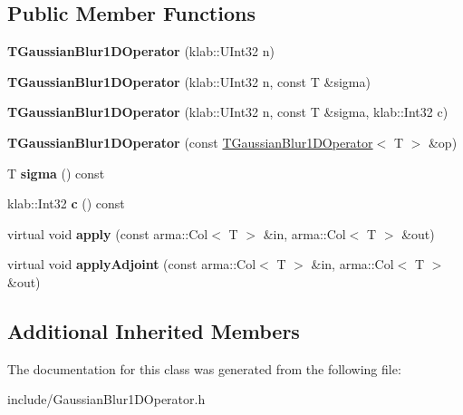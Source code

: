 \subsection*{Public Member Functions}
\begin{DoxyCompactItemize}
\item 
{\bfseries T\+Gaussian\+Blur1\+D\+Operator} (klab\+::\+U\+Int32 n)\hypertarget{classkl1p_1_1TGaussianBlur1DOperator_adfce593c12eed171d36fc4c644b46581}{}\label{classkl1p_1_1TGaussianBlur1DOperator_adfce593c12eed171d36fc4c644b46581}

\item 
{\bfseries T\+Gaussian\+Blur1\+D\+Operator} (klab\+::\+U\+Int32 n, const T \&sigma)\hypertarget{classkl1p_1_1TGaussianBlur1DOperator_a6bbbb52566ad498961cea10eb41cd3c6}{}\label{classkl1p_1_1TGaussianBlur1DOperator_a6bbbb52566ad498961cea10eb41cd3c6}

\item 
{\bfseries T\+Gaussian\+Blur1\+D\+Operator} (klab\+::\+U\+Int32 n, const T \&sigma, klab\+::\+Int32 c)\hypertarget{classkl1p_1_1TGaussianBlur1DOperator_a46967bf1040233065f9632491112258f}{}\label{classkl1p_1_1TGaussianBlur1DOperator_a46967bf1040233065f9632491112258f}

\item 
{\bfseries T\+Gaussian\+Blur1\+D\+Operator} (const \hyperlink{classkl1p_1_1TGaussianBlur1DOperator}{T\+Gaussian\+Blur1\+D\+Operator}$<$ T $>$ \&op)\hypertarget{classkl1p_1_1TGaussianBlur1DOperator_a15736b401979249a7db00f56106bab68}{}\label{classkl1p_1_1TGaussianBlur1DOperator_a15736b401979249a7db00f56106bab68}

\item 
T {\bfseries sigma} () const \hypertarget{classkl1p_1_1TGaussianBlur1DOperator_aff4f98560b1abb8ea038b0e7ce862be5}{}\label{classkl1p_1_1TGaussianBlur1DOperator_aff4f98560b1abb8ea038b0e7ce862be5}

\item 
klab\+::\+Int32 {\bfseries c} () const \hypertarget{classkl1p_1_1TGaussianBlur1DOperator_aee24e5571d642bfc3f418b85f84638f4}{}\label{classkl1p_1_1TGaussianBlur1DOperator_aee24e5571d642bfc3f418b85f84638f4}

\item 
virtual void {\bfseries apply} (const arma\+::\+Col$<$ T $>$ \&in, arma\+::\+Col$<$ T $>$ \&out)\hypertarget{classkl1p_1_1TGaussianBlur1DOperator_afa148df1de62ae6c874b2545faf7e781}{}\label{classkl1p_1_1TGaussianBlur1DOperator_afa148df1de62ae6c874b2545faf7e781}

\item 
virtual void {\bfseries apply\+Adjoint} (const arma\+::\+Col$<$ T $>$ \&in, arma\+::\+Col$<$ T $>$ \&out)\hypertarget{classkl1p_1_1TGaussianBlur1DOperator_ae81016302a1de4d81a629ff5f9f2c0e1}{}\label{classkl1p_1_1TGaussianBlur1DOperator_ae81016302a1de4d81a629ff5f9f2c0e1}

\end{DoxyCompactItemize}
\subsection*{Additional Inherited Members}


The documentation for this class was generated from the following file\+:\begin{DoxyCompactItemize}
\item 
include/Gaussian\+Blur1\+D\+Operator.\+h\end{DoxyCompactItemize}
